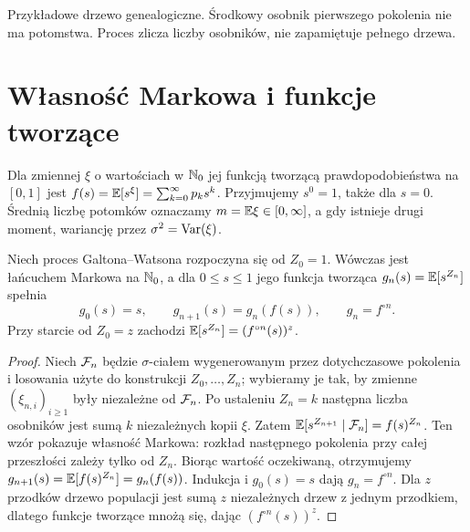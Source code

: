 \begin{center}
\par\smallskip\small Przykładowe drzewo genealogiczne.
Środkowy osobnik pierwszego pokolenia nie ma potomstwa.
Proces zlicza liczby osobników, nie zapamiętuje pełnego drzewa.
\end{center}

\section{Własność Markowa i funkcje tworzące}
\begin{definicja}
Dla zmiennej $\xi$ o wartościach w $\mathbb{N}_0$ jej funkcją tworzącą
prawdopodobieństwa na $[0,1]$ jest
$f(s)=\mathbb{E}[s^\xi]=\sum_{k=0}^\infty p_ks^k$.
Przyjmujemy $s^0=1$, także dla $s=0$.
Średnią liczbę potomków oznaczamy
$m=\mathbb{E}\xi\in[0,\infty]$, a gdy istnieje drugi moment,
wariancję przez $\sigma^2=\operatorname{Var}(\xi)$.
\end{definicja}

\begin{twierdzenie}
Niech proces Galtona--Watsona rozpoczyna się od $Z_0=1$.
Wówczas jest łańcuchem Markowa na $\mathbb{N}_0$, a dla
$0\le s\le1$ jego funkcja tworząca $g_n(s)=\mathbb{E}[s^{Z_n}]$
spełnia
\[
g_0(s)=s,\qquad g_{n+1}(s)=g_n(f(s)),
\qquad g_n=f^{\circ n}.
\]
Przy starcie od $Z_0=z$ zachodzi $\mathbb{E}[s^{Z_n}]=(f^{\circ n}(s))^z$.
\end{twierdzenie}
\begin{proof}
Niech $\mathcal{F}_n$ będzie $\sigma$-ciałem wygenerowanym
przez dotychczasowe pokolenia i losowania użyte do konstrukcji
$Z_0,\ldots,Z_n$; wybieramy je tak, by zmienne
$(\xi_{n,i})_{i\ge1}$ były niezależne od $\mathcal{F}_n$.
Po ustaleniu $Z_n=k$ następna liczba osobników jest sumą
$k$ niezależnych kopii $\xi$. Zatem
$\mathbb{E}[s^{Z_{n+1}}\mid\mathcal{F}_n]=f(s)^{Z_n}$.
Ten wzór pokazuje własność Markowa: rozkład następnego pokolenia
przy całej przeszłości zależy tylko od $Z_n$.
Biorąc wartość oczekiwaną, otrzymujemy
$g_{n+1}(s)=\mathbb{E}[f(s)^{Z_n}]=g_n(f(s))$.
Indukcja i $g_0(s)=s$ dają $g_n=f^{\circ n}$.
Dla $z$ przodków drzewo populacji jest sumą $z$
niezależnych drzew z jednym przodkiem, dlatego
funkcje tworzące mnożą się, dając $(f^{\circ n}(s))^z$.
\end{proof}

